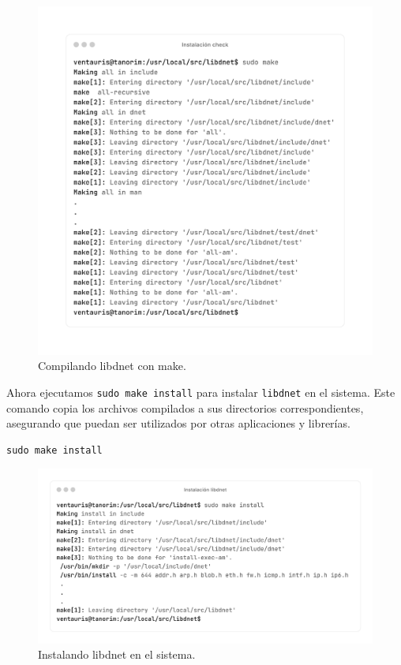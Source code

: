 \documentclass[11pt,a4paper,twoside]{report}
\begin{document}
\begin{figure}[H]
	\centering
	\includegraphics[scale=0.12]{instalacion_snort/4-4.png}
	\caption{Compilando libdnet con make.}
\end{figure}


\newpage

Ahora ejecutamos \texttt{sudo make install} para instalar \texttt{libdnet} en el sistema. Este comando copia los archivos compilados a sus directorios correspondientes, asegurando que puedan ser utilizados por otras aplicaciones y librerías.

\begin{lstlisting}[style=commandstyle, caption={Instalando libdnet en el sistema}]
	sudo make install
\end{lstlisting}


\begin{figure}[H]
	\centering
	\includegraphics[scale=0.12]{instalacion_snort/5-5.png}
	\caption{Instalando libdnet en el sistema.}
\end{figure}
\end{document}
